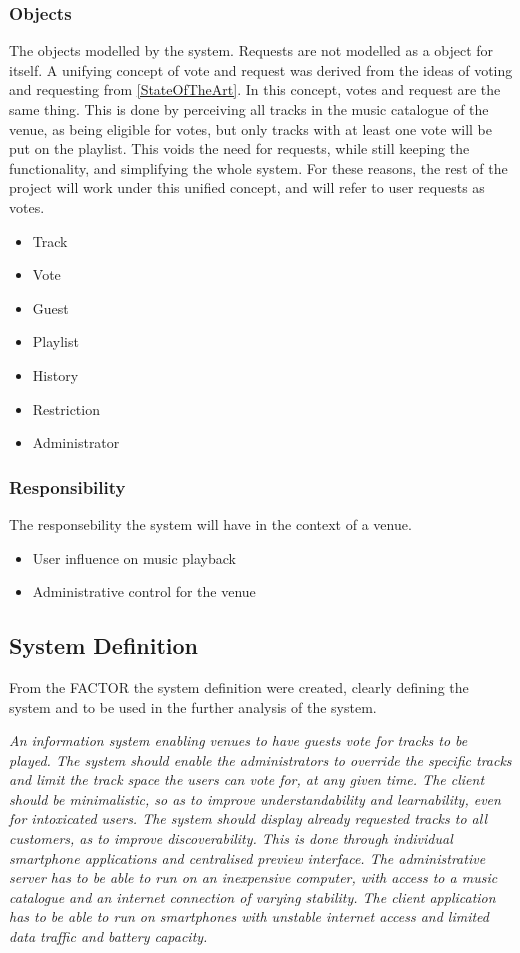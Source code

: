 \subsubsection{Objects}
The objects modelled by the system.
Requests are not modelled as a object for itself. A unifying concept of vote and request was derived from the ideas of voting and requesting from \cref{StateOfTheArt}. In this concept, votes and request are the same thing. This is done by perceiving all tracks in the music catalogue of the venue, as being eligible for votes, but only tracks with at least one vote will be put on the playlist. This voids the need for requests, while still keeping the functionality, and simplifying the whole system. For these reasons, the rest of the project will work under this unified concept, and will refer to user requests as votes.
\begin{itemize}
  \item Track
  \item Vote
  \item Guest
  \item Playlist
  \item History
  \item Restriction
  \item Administrator
\end{itemize}

\subsubsection{Responsibility}
The responsebility the system will have in the context of a venue.
\begin{itemize}
  \item User influence on music playback
  \item Administrative control for the venue
\end{itemize}

\subsection{System Definition}\label{sub:systemDefinition}
From the FACTOR the system definition were created, clearly defining the system and to be used in the further analysis of the system.

\begin{center}
\textit{An information system enabling venues to have guests vote for tracks to be played. The system should enable the administrators to override the specific tracks and limit the track space the users can vote for, at any given time. The client should be minimalistic, so as to improve understandability and learnability, even for intoxicated users. The system should display already requested tracks to all customers, as to improve discoverability. This is done through individual smartphone applications and centralised preview interface.
The administrative server has to be able to run on an inexpensive computer, with access to a music catalogue and an internet connection of varying stability. The client application has to be able to run on smartphones with unstable internet access and limited data traffic and battery capacity.}
\end{center}
